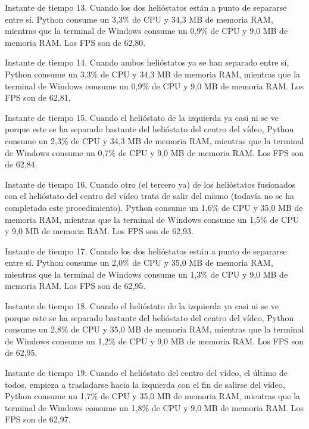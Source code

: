 \documentclass[12pt]{article}
\begin{document}
Instante de tiempo 13. Cuando los dos helióstatos están a punto de separarse entre sí. Python consume un 3,3\% de CPU y 34,3 MB de memoria RAM, mientras que la terminal de Windows consume un 0,9\% de CPU y 9,0 MB de memoria RAM. Los FPS son de 62,80.




Instante de tiempo 14. Cuando ambos helióstatos ya se han separado entre sí, Python consume un 3,3\% de CPU y 34,3 MB de memoria RAM, mientras que la terminal de Windows consume un 0,9\% de CPU y 9,0 MB de memoria RAM. Los FPS son de 62,81.




Instante de tiempo 15. Cuando el helióstato de la izquierda ya casi ni se ve porque este se ha separado bastante del helióstato del centro del vídeo, Python consume un 2,3\% de CPU y 34,3 MB de memoria RAM, mientras que la terminal de Windows consume un 0,7\% de CPU y 9,0 MB de memoria RAM. Los FPS son de 62,84.




Instante de tiempo 16. Cuando otro (el tercero ya) de los helióstatos fusionados con el helióstato del centro del vídeo trata de salir del mismo (todavía no se ha completado este procedimiento). Python consume un 1,6\% de CPU y 35,0 MB de memoria RAM, mientras que la terminal de Windows consume un 1,5\% de CPU y 9,0 MB de memoria RAM. Los FPS son de 62,93.




Instante de tiempo 17. Cuando los dos helióstatos están a punto de separarse entre sí. Python consume un 2,0\% de CPU y 35,0 MB de memoria RAM, mientras que la terminal de Windows consume un 1,3\% de CPU y 9,0 MB de memoria RAM. Los FPS son de 62,95.




Instante de tiempo 18. Cuando el helióstato de la izquierda ya casi ni se ve porque este se ha separado bastante del helióstato del centro del vídeo, Python consume un 2,8\% de CPU y 35,0 MB de memoria RAM, mientras que la terminal de Windows consume un 1,2\% de CPU y 9,0 MB de memoria RAM. Los FPS son de 62,95.




Instante de tiempo 19. Cuando el helióstato del centro del vídeo, el último de todos, empieza a trasladarse hacia la izquierda con el fin de salirse del vídeo, Python consume un 1,7\% de CPU y 35,0 MB de memoria RAM, mientras que la terminal de Windows consume un 1,8\% de CPU y 9,0 MB de memoria RAM. Los FPS son de 62,97.
\end{document}
